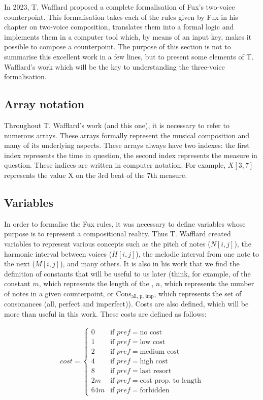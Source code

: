 In 2023, T. Wafflard proposed a complete formalisation of Fux's two-voice counterpoint. This formalisation takes each of the rules given by Fux in his chapter on two-voice composition, translates them into a formal logic and implements them in a computer tool which, by means of an input key, makes it possible to compose a counterpoint. The purpose of this section is not to summarise this excellent work in a few lines, but to present some elements of T. Wafflard's work which will be the key to understanding the three-voice formalisation.

\subsection{Array notation}
Throughout T. Wafflard's work (and this one), it is necessary to refer to numerous arrays. These arrays formally represent the musical composition and many of its underlying aspects. These arrays always have two indexes: the first index represents the time in question, the second index represents the measure in question. These indices are written in computer notation. For example, $X[3, 7]$ represents the value X on the 3rd beat of the 7th measure.

\subsection{Variables}
In order to formalise the Fux rules, it was necessary to define variables whose purpose is to represent a compositional reality. Thus T. Wafflard created variables to represent various concepts such as the pitch of notes ($N[i,j]$), the harmonic interval between voices ($H[i,j]$), the melodic interval from one note to the next ($M[i,j]$), and many others. It is also in his work that we find the definition of constants that will be useful to us later (think, for example, of the constant $m$, which represents the length of the \cf, $n$, which represents the number of notes in a given counterpoint, or Cons$_{\text{all, p, imp}}$, which represents the set of consonances (all, perfect and imperfect)).
Costs are also defined, which will be more than useful in this work. These costs are defined as follows:

\begin{equation}
    \begin{gathered}
        cost = \begin{cases}
            0 & \text{if } pref = \text{no cost}\\
            1 & \text{if } pref = \text{low cost}\\
            2 & \text{if } pref = \text{medium cost}\\
            4 & \text{if } pref = \text{high cost}\\
            8 & \text{if } pref = \text{last resort}\\
            2m & \text{if } pref = \text{cost prop. to length}\\
            64m & \text{if } pref = \text{forbidden}
        \end{cases}
    \end{gathered}
\end{equation}

